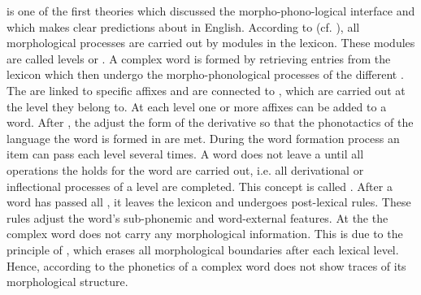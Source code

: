  is one of the first theories which discussed the morpho-phono-logical interface and which makes clear predictions about  in English. According to  (cf. \citealt{Kiparsky.1982,Mohanan.1986}), all morphological processes are carried out by modules in the lexicon. These modules are called levels or . A complex word is formed by retrieving entries from the lexicon which then undergo the morpho-phonological processes of the different . The  are linked to specific affixes and are connected to , which are carried out at the level they belong to. At each level one or more affixes can be added to a word. After , the  adjust the form of the derivative so that the phonotactics of the language the word is formed in are met. During the word formation process an item can pass each level several times. A word does not leave a  until all operations the  holds for the word are carried out, i.e. all derivational or inflectional processes of a level are completed. This concept is called . After a word has passed all , it leaves the lexicon and undergoes post-lexical rules. These rules adjust the word's sub-phonemic and word-external features. 
At the  the complex word does not carry any morphological information.  This is due to the principle of , which erases all morphological boundaries after each lexical level. Hence, according to  the phonetics of a complex word does not show traces of its morphological structure.

